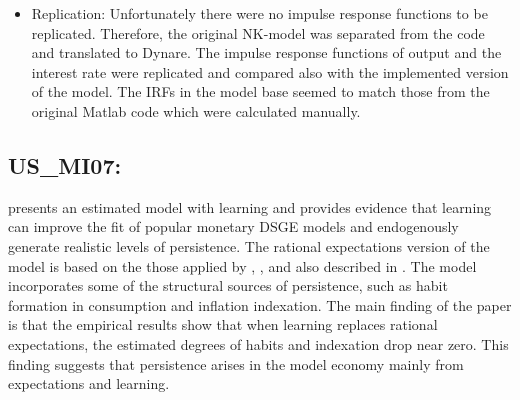 \documentclass[11pt,a4paper]{article}
\begin{document}
\begin{itemize}
		\item Replication: Unfortunately there were no impulse response functions to be replicated. Therefore, the original NK-model was separated from the code and translated to Dynare. The impulse response functions of output and the interest rate were replicated and compared also with the implemented version of the model. The IRFs in the model base seemed to match those from the original Matlab code which were calculated manually.
		
	\end{itemize}
	
	
	\subsection{US\_MI07: \texorpdfstring{\cite{Milani2007}}{Milani (2007)}}
	\label{USMI07}
	
	\cite{Milani2007} presents an estimated model with learning and provides evidence that learning can improve the fit of popular monetary DSGE models and endogenously generate realistic levels of persistence. The rational expectations version of the model is based on the those applied by \cite{boivin2006has}, \cite{giannoni2003optimal}, and also described in \cite{Woodford2003}. The model incorporates some of the structural sources of persistence, such as habit formation in consumption and inflation indexation. The main finding of the paper is that the empirical results show that when learning replaces rational expectations, the estimated degrees of habits and indexation drop near zero. This finding suggests that persistence arises in the model economy mainly from expectations and learning.
	
\end{document}
